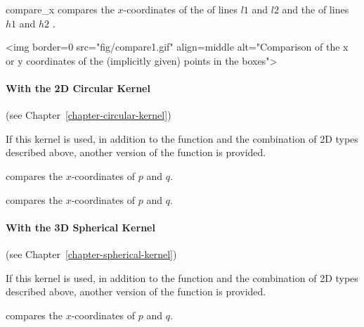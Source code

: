 \begin{ccRefFunction}{compare_x}
        {compares the $x$-coordinates of the  of lines $l1$
         and $l2$ and  the  of lines $h1$ and $h2$%
         .}

\begin{ccHtmlOnly}
<img border=0 src="fig/compare1.gif" align=middle alt="Comparison of the x 
or y coordinates of the (implicitly given) points in the boxes">
\end{ccHtmlOnly} 

\paragraph{With the 2D Circular Kernel} (see Chapter~\ref{chapter-circular-kernel}) 


If this kernel is used, in addition to the function and the
combination of 2D types described above, another version of the function
is provided.

{compares the $x$-coordinates of $p$ and $q$.}

{compares the $x$-coordinates of $p$ and $q$.}

\paragraph{With the 3D Spherical Kernel} (see Chapter~\ref{chapter-spherical-kernel}) 


If this kernel is used, in addition to the function and the
combination of 2D types described above, another version of the function
is provided.

{compares the $x$-coordinates of $p$ and $q$.}


\end{ccRefFunction}
